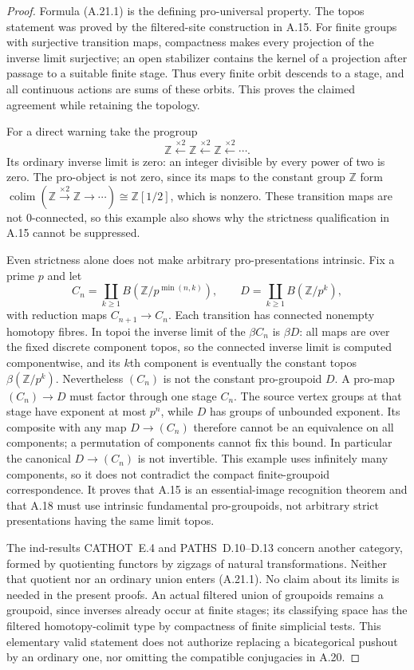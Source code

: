 \begin{proof}
Formula (A.21.1) is the defining pro-universal property. The topos statement was proved by the filtered-site construction in A.15. For finite groups with surjective transition maps, compactness makes every projection of the inverse limit surjective; an open stabilizer contains the kernel of a projection after passage to a suitable finite stage. Thus every finite orbit descends to a stage, and all continuous actions are sums of these orbits. This proves the claimed agreement while retaining the topology.

For a direct warning take the progroup
\[
 \mathbb Z\xleftarrow{\times2}\mathbb Z
             \xleftarrow{\times2}\mathbb Z\xleftarrow{\times2}\cdots.
\]
Its ordinary inverse limit is zero: an integer divisible by every power of two is zero. The pro-object is not zero, since its maps to the constant group $\mathbb Z$ form
$\operatorname{colim}(\mathbb Z\xrightarrow{\times2}\mathbb Z\to\cdots)
\cong\mathbb Z[1/2]$, which is nonzero. These transition maps are not $0$-connected, so this example also shows why the strictness qualification in A.15 cannot be suppressed.

Even strictness alone does not make arbitrary pro-presentations intrinsic. Fix a prime $p$ and let
\[
 C_n=\coprod_{k\ge1}B(\mathbb Z/p^{\min(n,k)}),
 \qquad D=\coprod_{k\ge1}B(\mathbb Z/p^k),
                                                        \tag{A.21.2}
\]
with reduction maps $C_{n+1}\to C_n$. Each transition has connected nonempty homotopy fibres. In topoi the inverse limit of the $\beta C_n$ is $\beta D$: all maps are over the fixed discrete component topos, so the connected inverse limit is computed componentwise, and its $k$th component is eventually the constant topos $\beta(\mathbb Z/p^k)$. Nevertheless $(C_n)$ is not the constant pro-groupoid $D$. A pro-map $(C_n)\to D$ must factor through one stage $C_n$. The source vertex groups at that stage have exponent at most $p^n$, while $D$ has groups of unbounded exponent. Its composite with any map $D\to(C_n)$ therefore cannot be an equivalence on all components; a permutation of components cannot fix this bound. In particular the canonical $D\to(C_n)$ is not invertible. This example uses infinitely many components, so it does not contradict the compact finite-groupoid correspondence. It proves that A.15 is an essential-image recognition theorem and that A.18 must use intrinsic fundamental pro-groupoids, not arbitrary strict presentations having the same limit topos.

The ind-results CATHOT~E.4 and PATHS~D.10--D.13 concern another category, formed by quotienting functors by zigzags of natural transformations. Neither that quotient nor an ordinary union enters (A.21.1). No claim about its limits is needed in the present proofs. An actual filtered union of groupoids remains a groupoid, since inverses already occur at finite stages; its classifying space has the filtered homotopy-colimit type by compactness of finite simplicial tests. This elementary valid statement does not authorize replacing a bicategorical pushout by an ordinary one, nor omitting the compatible conjugacies in A.20. 
\end{proof}

